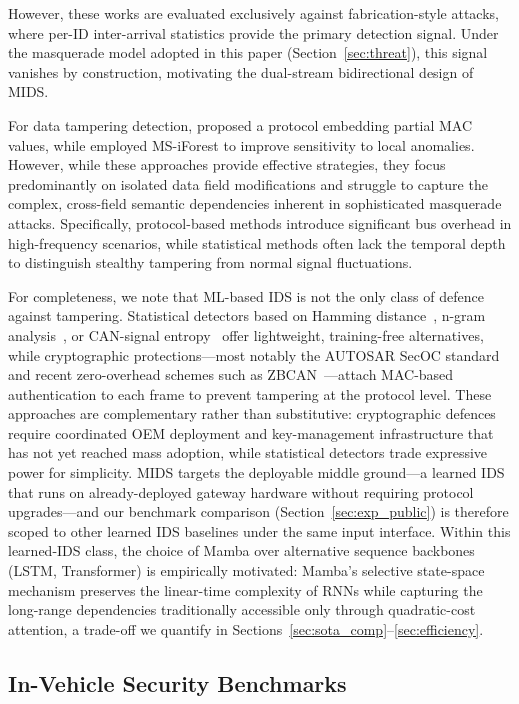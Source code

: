 \documentclass[lettersize,journal]{IEEEtran}
\begin{document}
However, these works are evaluated exclusively against 
fabrication-style attacks, where per-ID inter-arrival 
statistics provide the primary detection signal. Under the 
masquerade model adopted in this paper 
(Section~\ref{sec:threat}), this signal vanishes by 
construction, motivating the dual-stream bidirectional 
design of MIDS.

For data tampering detection, \cite{b51} proposed a protocol embedding partial MAC values, while \cite{b52} employed MS-iForest to improve sensitivity to local anomalies. However, while these approaches provide effective strategies, they focus predominantly on isolated data field modifications and struggle to capture the complex, cross-field semantic dependencies inherent in sophisticated masquerade attacks. Specifically, protocol-based methods \cite{b51} introduce significant bus overhead in high-frequency scenarios, while statistical methods \cite{b52} often lack the temporal depth to distinguish stealthy tampering from normal signal fluctuations.

For completeness, we note that ML-based IDS is not the only
class of defence against tampering. Statistical detectors based
on Hamming distance~\cite{b66}, n-gram analysis~\cite{b31},
or CAN-signal entropy~\cite{b67} offer lightweight, training-free
alternatives, while cryptographic protections---most notably the
AUTOSAR SecOC standard~\cite{b68} and recent zero-overhead
schemes such as ZBCAN~\cite{b69}---attach MAC-based
authentication to each frame to prevent tampering at the
protocol level. These approaches are complementary rather than
substitutive: cryptographic defences require coordinated OEM
deployment and key-management infrastructure that has not yet
reached mass adoption, while statistical detectors trade
expressive power for simplicity. MIDS targets the deployable
middle ground---a learned IDS that runs on already-deployed
gateway hardware without requiring protocol upgrades---and our
benchmark comparison (Section~\ref{sec:exp_public}) is therefore
scoped to other learned IDS baselines under the same input
interface. Within this learned-IDS class, the choice of Mamba
over alternative sequence backbones (LSTM, Transformer) is
empirically motivated: Mamba's selective state-space mechanism
preserves the linear-time complexity of RNNs while capturing the
long-range dependencies traditionally accessible only through
quadratic-cost attention, a trade-off we quantify in
Sections~\ref{sec:sota_comp}--\ref{sec:efficiency}.

\subsection{In-Vehicle Security Benchmarks}
\end{document}
